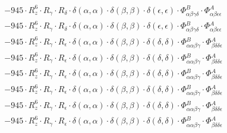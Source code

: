 \documentclass{article}
\begin{document}
\begin{subequations}
\begin{gather}
\begin{array}{c}
 \\[0.2em] 		 - 945 \cdot R_{z}^{6} \cdot R_{\gamma{}} \cdot R_{\delta{}} \cdot \delta{}\left(\alpha{}, \alpha{}\right) \cdot \delta{}\left(\beta{}, \beta{}\right) \cdot \delta{}\left(\epsilon{}, \epsilon{}\right) \cdot \Phi{}^{B}_{\alpha{}\beta{}\gamma{}\delta{}} \cdot \Phi{}^{A}_{\alpha{}\beta{}\epsilon{}\epsilon{}} 
 \\[0.2em] 		 - 945 \cdot R_{z}^{6} \cdot R_{\gamma{}} \cdot R_{\delta{}} \cdot \delta{}\left(\alpha{}, \alpha{}\right) \cdot \delta{}\left(\beta{}, \beta{}\right) \cdot \delta{}\left(\epsilon{}, \epsilon{}\right) \cdot \Phi{}^{B}_{\alpha{}\beta{}\gamma{}\delta{}} \cdot \Phi{}^{A}_{\alpha{}\beta{}\epsilon{}\epsilon{}} 
 \\[0.2em] 		 - 945 \cdot R_{z}^{6} \cdot R_{\gamma{}} \cdot R_{\epsilon{}} \cdot \delta{}\left(\alpha{}, \alpha{}\right) \cdot \delta{}\left(\beta{}, \beta{}\right) \cdot \delta{}\left(\delta{}, \delta{}\right) \cdot \Phi{}^{B}_{\alpha{}\alpha{}\beta{}\gamma{}} \cdot \Phi{}^{A}_{\beta{}\delta{}\delta{}\epsilon{}} 
 \\[0.2em] 		 - 945 \cdot R_{z}^{6} \cdot R_{\gamma{}} \cdot R_{\epsilon{}} \cdot \delta{}\left(\alpha{}, \alpha{}\right) \cdot \delta{}\left(\beta{}, \beta{}\right) \cdot \delta{}\left(\delta{}, \delta{}\right) \cdot \Phi{}^{B}_{\alpha{}\alpha{}\beta{}\gamma{}} \cdot \Phi{}^{A}_{\beta{}\delta{}\delta{}\epsilon{}} 
 \\[0.2em] 		 - 945 \cdot R_{z}^{6} \cdot R_{\gamma{}} \cdot R_{\epsilon{}} \cdot \delta{}\left(\alpha{}, \alpha{}\right) \cdot \delta{}\left(\beta{}, \beta{}\right) \cdot \delta{}\left(\delta{}, \delta{}\right) \cdot \Phi{}^{B}_{\alpha{}\alpha{}\beta{}\gamma{}} \cdot \Phi{}^{A}_{\beta{}\delta{}\delta{}\epsilon{}} 
 \\[0.2em] 		 - 945 \cdot R_{z}^{6} \cdot R_{\gamma{}} \cdot R_{\epsilon{}} \cdot \delta{}\left(\alpha{}, \alpha{}\right) \cdot \delta{}\left(\beta{}, \beta{}\right) \cdot \delta{}\left(\delta{}, \delta{}\right) \cdot \Phi{}^{B}_{\alpha{}\alpha{}\beta{}\gamma{}} \cdot \Phi{}^{A}_{\beta{}\delta{}\delta{}\epsilon{}} 
 \\[0.2em] 		 - 945 \cdot R_{z}^{6} \cdot R_{\gamma{}} \cdot R_{\epsilon{}} \cdot \delta{}\left(\alpha{}, \alpha{}\right) \cdot \delta{}\left(\beta{}, \beta{}\right) \cdot \delta{}\left(\delta{}, \delta{}\right) \cdot \Phi{}^{B}_{\alpha{}\alpha{}\beta{}\gamma{}} \cdot \Phi{}^{A}_{\beta{}\delta{}\delta{}\epsilon{}} 
 \\[0.2em] 		 - 945 \cdot R_{z}^{6} \cdot R_{\gamma{}} \cdot R_{\epsilon{}} \cdot \delta{}\left(\alpha{}, \alpha{}\right) \cdot \delta{}\left(\beta{}, \beta{}\right) \cdot \delta{}\left(\delta{}, \delta{}\right) \cdot \Phi{}^{B}_{\alpha{}\alpha{}\beta{}\gamma{}} \cdot \Phi{}^{A}_{\beta{}\delta{}\delta{}\epsilon{}} 

\end{array}
\end{gather}
\end{subequations}
\end{document}
